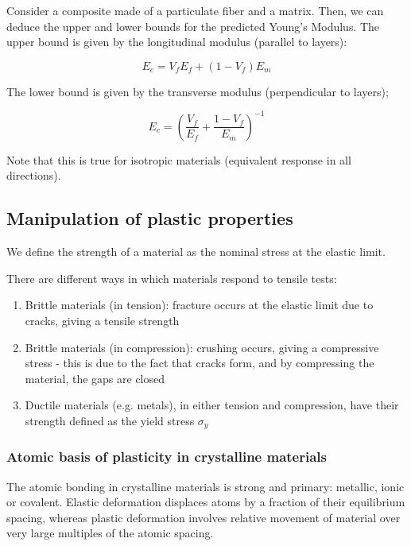 \documentclass{article}
\begin{document}
\begin{proposition}
    Consider a composite made of a particulate fiber and a matrix. Then, we can deduce the upper and lower bounds for the predicted Young's Modulus. The upper bound is given by the longitudinal modulus (parallel to layers):

    \[ E_c = V_fE_f + (1 - V_f)E_m \]

    The lower bound is given by the transverse modulus (perpendicular to layers);

    \[ E_c = \left(\frac{V_f}{E_f} + \frac{1 - V_f}{E_m}\right)^{-1} \]

    Note that this is true for isotropic materials (equivalent response in all directions).
\end{proposition}

\subsection{Manipulation of plastic properties}

\begin{definition}[Strength]
    We define the strength of a material as the nominal stress at the elastic limit.
\end{definition}

There are different ways in which materials respond to tensile tests:

\begin{enumerate}
    \item Brittle materials (in tension): fracture occurs at the elastic limit due to cracks, giving a tensile strength
    \item Brittle materials (in compression): crushing occurs, giving a compressive stress - this is due to the fact that cracks form, and by compressing the material, the gaps are closed
    \item Ductile materials (e.g. metals), in either tension and compression, have their strength defined as the yield stress $\sigma_y$
\end{enumerate}

\subsubsection{Atomic basis of plasticity in crystalline materials}

The atomic bonding in crystalline materials is strong and primary: metallic, ionic or covalent. Elastic deformation displaces atoms by a fraction of their equilibrium spacing, whereas plastic deformation involves relative movement of material over very large multiples of the atomic spacing.
\end{document}
